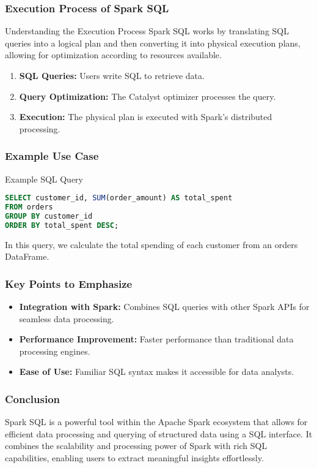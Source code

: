 \documentclass[aspectratio=169]{beamer}
\begin{document}
\begin{frame}[fragile]
    \frametitle{Execution Process of Spark SQL}
    \begin{block}{Understanding the Execution Process}
        Spark SQL works by translating SQL queries into a logical plan and then converting it into physical execution plans, allowing for optimization according to resources available.
    \end{block}
    \begin{enumerate}
        \item \textbf{SQL Queries:} Users write SQL to retrieve data.
        \item \textbf{Query Optimization:} The Catalyst optimizer processes the query.
        \item \textbf{Execution:} The physical plan is executed with Spark's distributed processing.
    \end{enumerate}
\end{frame}

\begin{frame}[fragile]
    \frametitle{Example Use Case}
    \begin{block}{Example SQL Query}
        \begin{lstlisting}[language=SQL]
SELECT customer_id, SUM(order_amount) AS total_spent
FROM orders
GROUP BY customer_id
ORDER BY total_spent DESC;
        \end{lstlisting}
    \end{block}
    In this query, we calculate the total spending of each customer from an orders DataFrame.
\end{frame}

\begin{frame}
    \frametitle{Key Points to Emphasize}
    \begin{itemize}
        \item \textbf{Integration with Spark:} Combines SQL queries with other Spark APIs for seamless data processing.
        \item \textbf{Performance Improvement:} Faster performance than traditional data processing engines.
        \item \textbf{Ease of Use:} Familiar SQL syntax makes it accessible for data analysts.
    \end{itemize}
\end{frame}

\begin{frame}
    \frametitle{Conclusion}
    Spark SQL is a powerful tool within the Apache Spark ecosystem that allows for efficient data processing and querying of structured data using a SQL interface. It combines the scalability and processing power of Spark with rich SQL capabilities, enabling users to extract meaningful insights effortlessly.
\end{frame}
\end{document}
